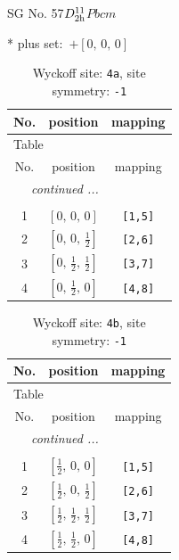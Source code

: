 \documentclass[fleqn,8pt]{jsarticle}
\begin{document}
\setcounter{MaxMatrixCols}{32}

\renewcommand{\tablename}{Table~}
\renewcommand{\figurename}{Figure~}
\begin{center}
\LARGE
SG No. 57\quad$D_{\rm 2h}^{11}$\quad$Pbcm$\quad[ orthorhombic ]
\end{center}
* plus set:\,\,\,$+\left[ 0,\, 0,\, 0 \right]$
\renewcommand{\arraystretch}{1.2}
\begin{longtable}{ccc}
\caption{Wyckoff site: {\tt 4a}, site symmetry: {\tt -1}}
 \\
 \hline \hline
No. & position & mapping \\ \hline \endfirsthead

\multicolumn{2}{l}{\tablename\ \thetable{}} \\
 \hline \hline
No. & position & mapping \\ \hline \endhead

 \hline \hline
\multicolumn{2}{r}{\footnotesize\it continued ...} \\ \endfoot

 \hline \hline
\multicolumn{2}{r}{} \\ \endlastfoot

1 & $\left[ 0,\, 0,\, 0 \right]$ & {\tt [1,5]} \\ \hline
2 & $\left[ 0,\, 0,\, \frac{1}{2} \right]$ & {\tt [2,6]} \\ \hline
3 & $\left[ 0,\, \frac{1}{2},\, \frac{1}{2} \right]$ & {\tt [3,7]} \\ \hline
4 & $\left[ 0,\, \frac{1}{2},\, 0 \right]$ & {\tt [4,8]} \\
\end{longtable}
\renewcommand{\arraystretch}{1.2}
\begin{longtable}{ccc}
\caption{Wyckoff site: {\tt 4b}, site symmetry: {\tt -1}}
 \\
 \hline \hline
No. & position & mapping \\ \hline \endfirsthead

\multicolumn{2}{l}{\tablename\ \thetable{}} \\
 \hline \hline
No. & position & mapping \\ \hline \endhead

 \hline \hline
\multicolumn{2}{r}{\footnotesize\it continued ...} \\ \endfoot

 \hline \hline
\multicolumn{2}{r}{} \\ \endlastfoot

1 & $\left[ \frac{1}{2},\, 0,\, 0 \right]$ & {\tt [1,5]} \\ \hline
2 & $\left[ \frac{1}{2},\, 0,\, \frac{1}{2} \right]$ & {\tt [2,6]} \\ \hline
3 & $\left[ \frac{1}{2},\, \frac{1}{2},\, \frac{1}{2} \right]$ & {\tt [3,7]} \\ \hline
4 & $\left[ \frac{1}{2},\, \frac{1}{2},\, 0 \right]$ & {\tt [4,8]} \\
\end{longtable}
\end{document}
